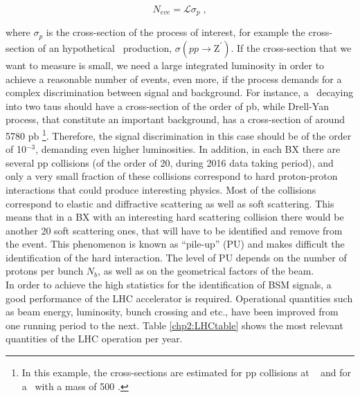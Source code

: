 \begin{equation}
 N_{eve} = \mathscr{L} \sigma_{p} \;,
\end{equation}

\noindent where $\sigma_{p}$ is the cross-section of the process of interest,
for example the cross-section of an hypothetical \Zprime~production, 
$\sigma(pp \rightarrow \textrm{Z}^{\prime})$. If the cross-section that
we want to measure is small, we need a large integrated luminosity
in order to achieve a reasonable number of events, even more, if the process
demands for a complex discrimination between signal and background. For instance, a 
\Zprime~decaying into two taus should have a cross-section of the order of pb, while 
Drell-Yan process, that constitute an important background, has a 
cross-section of around 5780 pb \footnote[7]{In this example, the cross-sections
are estimated for pp collisions at  \TeV~ and for a \Zprime~with a mass of 500 \GeV.}.
Therefore, the signal discrimination in this case should be of the order of 10$^{-3}$,
demanding even higher luminosities. In addition, in each BX there are several pp
 collisions (of the order of 20, during 2016 data taking period), and only a very small 
 fraction of these collisions correspond to hard proton-proton interactions that could produce
 interesting physics. Most of the collisions correspond to elastic and diffractive scattering
 as well as soft scattering. This means that in a BX with an interesting hard 
 scattering collision there would be another 20 soft scattering ones, that will have to be 
 identified and remove from the event. This phenomenon is known as “pile-up” 
 (PU) and makes difficult the identification of the hard interaction. The level 
 of PU depends on the number of protons per bunch $N_{b}$, as well as on the geometrical 
 factors of the beam. \\
 
\noindent  In order to achieve the high statistics for the identification of BSM signals, a good performance 
 of the LHC accelerator is required. Operational quantities such as beam energy, luminosity, bunch crossing and etc., 
 have been improved from one running period to the next. Table \ref{chp2:LHCtable}
 shows the most relevant quantities of the LHC operation per year.
 
